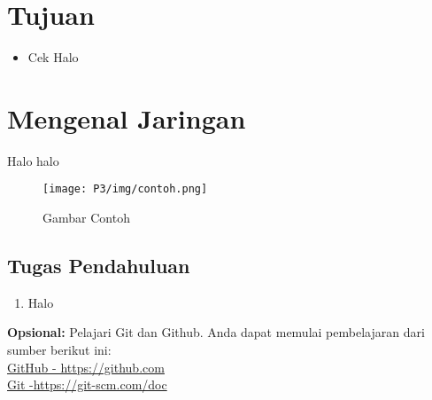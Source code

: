 \section{Tujuan}
\begin{itemize}[label=$\bullet$, itemsep=-1pt, leftmargin=*]
    \item Cek Halo
\end{itemize}

\section{Mengenal Jaringan}
Halo halo

\begin{figure}[H]
    \centering
    \texttt{[image: P3/img/contoh.png]}
    \caption{Gambar Contoh}
    \label{fig:gambarcontoh}
\end{figure}

\subsection{Tugas Pendahuluan}
\begin{enumerate}
    \item Halo
\end{enumerate}


\begin{center}
    \colorbox{cyan!30}{\parbox{0.8\linewidth}{\textbf{Opsional:} Pelajari Git dan Github. Anda dapat memulai pembelajaran dari sumber berikut ini: \\ \href{https://github.com}{GitHub - https://github.com} \\ \href{https://git-scm.com/doc}{Git -https://git-scm.com/doc}}}
\end{center}